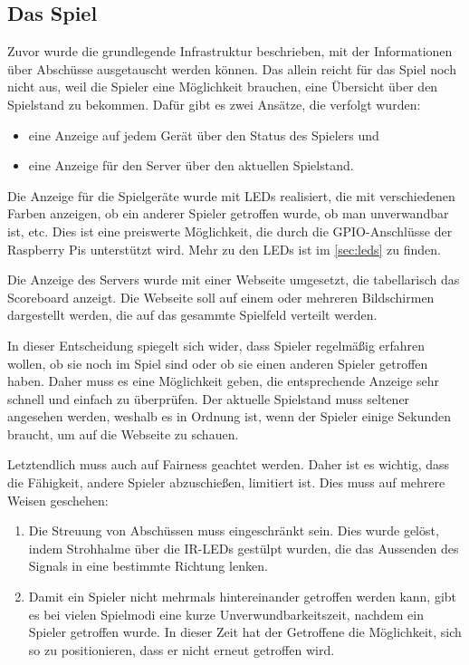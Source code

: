 \subsection{Das Spiel}
\label{sec:architektur-spiel}

Zuvor wurde die grundlegende Infrastruktur beschrieben, mit der Informationen über Abschüsse
ausgetauscht werden können.
Das allein reicht für das Spiel noch nicht aus, weil die Spieler eine Möglichkeit brauchen, eine
Übersicht über den Spielstand zu bekommen.
Dafür gibt es zwei Ansätze, die verfolgt wurden:
\begin{itemize}
  \item
    eine Anzeige auf jedem Gerät über den Status des Spielers und
  \item
    eine Anzeige für den Server über den aktuellen Spielstand.
\end{itemize}
Die Anzeige für die Spielgeräte wurde mit LEDs realisiert, die mit verschiedenen Farben anzeigen, ob
ein anderer Spieler getroffen wurde, ob man unverwandbar ist, etc.
Dies ist eine preiswerte Möglichkeit, die durch die GPIO-Anschlüsse der Raspberry Pis unterstützt
wird.
Mehr zu den LEDs ist im \cref{sec:leds} zu finden.

Die Anzeige des Servers wurde mit einer Webseite umgesetzt, die tabellarisch das Scoreboard anzeigt.
Die Webseite soll auf einem oder mehreren Bildschirmen dargestellt werden, die auf das gesammte
Spielfeld verteilt werden.

In dieser Entscheidung spiegelt sich wider, dass Spieler regelmäßig erfahren wollen, ob sie noch im
Spiel sind oder ob sie einen anderen Spieler getroffen haben.
Daher muss es eine Möglichkeit geben, die entsprechende Anzeige sehr schnell und einfach zu
überprüfen.
Der aktuelle Spielstand muss seltener angesehen werden, weshalb es in Ordnung ist, wenn der Spieler
einige Sekunden braucht, um auf die Webseite zu schauen.

Letztendlich muss auch auf Fairness geachtet werden.
Daher ist es wichtig, dass die Fähigkeit, andere Spieler abzuschießen, limitiert ist.
Dies muss auf mehrere Weisen geschehen:
\begin{enumerate}
  \item
    Die Streuung von Abschüssen muss eingeschränkt sein.
    Dies wurde gelöst, indem Strohhalme über die IR-LEDs gestülpt wurden, die das Aussenden des
    Signals in eine bestimmte Richtung lenken.
  \item
    Damit ein Spieler nicht mehrmals hintereinander getroffen werden kann, gibt es bei vielen
    Spielmodi eine kurze Unverwundbarkeitszeit, nachdem ein Spieler getroffen wurde.
    In dieser Zeit hat der Getroffene die Möglichkeit, sich so zu positionieren, dass er nicht
    erneut getroffen wird.
\end{enumerate}
